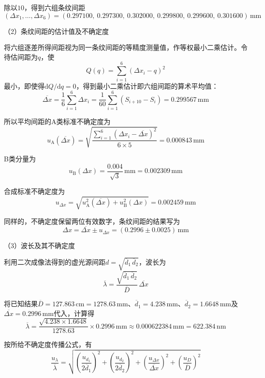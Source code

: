 \documentclass[10pt,a4paper]{ctexart} %
\begin{document}
  除以$10$，得到六组条纹间距
  \[
    (\Delta x_1,\ldots,\Delta x_6)
    =(0.297100,\ 0.297300,\ 0.302000,\ 0.299800,\ 0.299600,\ 0.301600)\,\mathrm{mm}
  \]

  \noindent （2）条纹间距的估计值及不确定度

  将六组逐差所得间距视为同一条纹间距的等精度测量值，作等权最小二乘估计。令待估间距为$q$，使
  \[
    Q(q)=\sum_{i=1}^{6}(\Delta x_i-q)^2
  \]
  最小，即使得$\mathrm{d}Q/\mathrm{d}q=0$，得到最小二乘估计即六组间距的算术平均值：
  \[
    \overline{\Delta x}=\frac{1}{6}\sum_{i=1}^{6}\Delta x_i
      =\frac{1}{60}\sum_{i=1}^{6}(S_{i+10}-S_i)
      =0.299567\,\mathrm{mm}
  \]

  所以平均间距的A类标准不确定度为
  \[
    u_{\mathrm{A}}(\overline{\Delta x})
      =\sqrt{\frac{\sum_{i=1}^{6}(\Delta x_i-\overline{\Delta x})^2}{6\times5}}
      =0.000843\,\mathrm{mm}
  \]

  B类分量为
  \[
    u_{\mathrm{B}}(\Delta x)
      =\frac{0.004}{\sqrt{3}}\,\mathrm{mm}
      =0.002309\,\mathrm{mm}
  \]

  合成标准不确定度为
  \[
    u_{\Delta x}
      =\sqrt{u_{\mathrm{A}}^2(\overline{\Delta x})+u_{\mathrm{B}}^2(\Delta x)}
      =0.002459\,\mathrm{mm}
  \]

  同样的，不确定度保留两位有效数字，条纹间距的结果写为
  \[
    \boxed{\Delta x=\overline{\Delta x}\pm u_{\Delta x}
      =(0.2996\pm0.0025)\,\mathrm{mm}}
  \]

  \noindent （3）波长及其不确定度

  利用二次成像法得到的虚光源间距$d=\sqrt{\overline{d}_1\,\overline{d}_2}$，波长为
  \[
    \overline{\lambda}
      =\frac{\sqrt{\overline{d}_1\,\overline{d}_2}}{\overline{D}}\,
        \overline{\Delta x}
  \]

  将已知结果$\overline{D}=127.863\,\mathrm{cm}=1278.63\,\mathrm{mm}$、$\overline{d}_1=4.238\,\mathrm{mm}$、$\overline{d}_2=1.6648\,\mathrm{mm}$及$\overline{\Delta x}=0.2996\,\mathrm{mm}$代入，计算得
  \[
    \overline{\lambda}
      =\frac{\sqrt{4.238\times1.6648}}{1278.63}
        \times0.2996\,\mathrm{mm}
      \approx0.000622384\,\mathrm{mm}
      =622.384\,\mathrm{nm}
  \]

  按所给不确定度传播公式，有
  \[
    \frac{u_\lambda}{\overline{\lambda}}
      =\sqrt{\left(\frac{u_{d_1}}{2\overline{d}_1}\right)^2
             +\left(\frac{u_{d_2}}{2\overline{d}_2}\right)^2
             +\left(\frac{u_{\Delta x}}{\overline{\Delta x}}\right)^2
             +\left(\frac{u_D}{\overline{D}}\right)^2}
  \]
\end{document}
